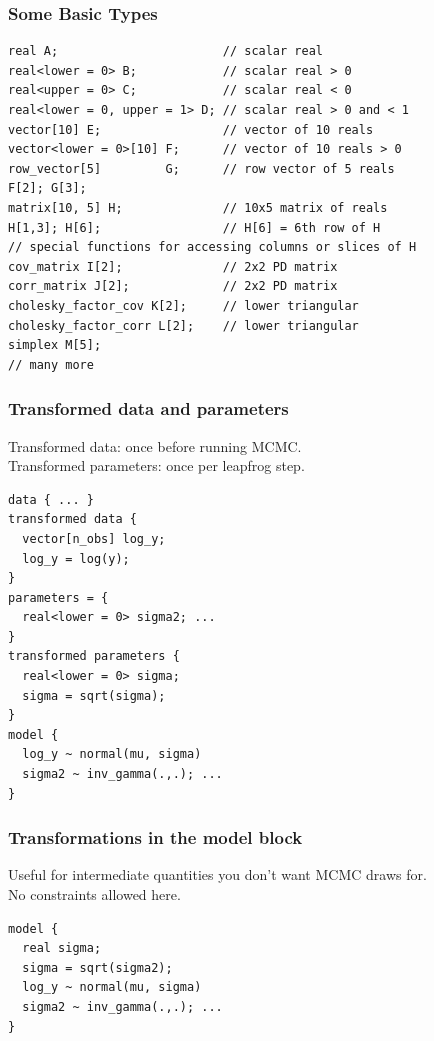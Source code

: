 \documentclass[xcolor=dvipsnames]{beamer}
\begin{document}
\begin{frame}[fragile]
\frametitle{Some Basic Types}
\begin{verbatim}
real A;                       // scalar real
real<lower = 0> B;            // scalar real > 0
real<upper = 0> C;            // scalar real < 0
real<lower = 0, upper = 1> D; // scalar real > 0 and < 1
vector[10] E;                 // vector of 10 reals
vector<lower = 0>[10] F;      // vector of 10 reals > 0
row_vector[5]         G;      // row vector of 5 reals
F[2]; G[3];                   
matrix[10, 5] H;              // 10x5 matrix of reals
H[1,3]; H[6];                 // H[6] = 6th row of H
// special functions for accessing columns or slices of H
cov_matrix I[2];              // 2x2 PD matrix
corr_matrix J[2];             // 2x2 PD matrix
cholesky_factor_cov K[2];     // lower triangular
cholesky_factor_corr L[2];    // lower triangular
simplex M[5];  
// many more
\end{verbatim}
\end{frame}

\begin{frame}[fragile]
\frametitle{Transformed data and parameters}
Transformed data: once before running MCMC.\\
Transformed parameters: once per leapfrog step.\\
\begin{verbatim}
data { ... }
transformed data {
  vector[n_obs] log_y;
  log_y = log(y);
}
parameters = { 
  real<lower = 0> sigma2; ...
}
transformed parameters {
  real<lower = 0> sigma;
  sigma = sqrt(sigma);
}
model { 
  log_y ~ normal(mu, sigma)
  sigma2 ~ inv_gamma(.,.); ...
}
\end{verbatim}
\end{frame}

\begin{frame}[fragile]
\frametitle{Transformations in the model block}
Useful for intermediate quantities you don't want MCMC draws for.\\
No constraints allowed here.
\begin{verbatim}
model {
  real sigma;
  sigma = sqrt(sigma2);
  log_y ~ normal(mu, sigma)
  sigma2 ~ inv_gamma(.,.); ...
}
\end{verbatim}
\end{frame}
\end{document}
